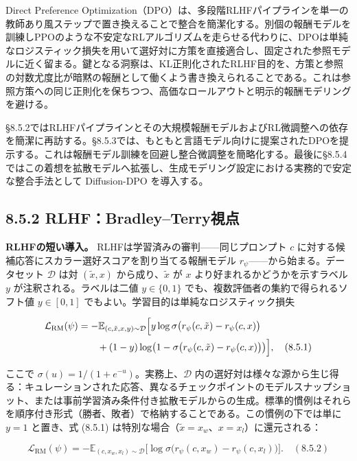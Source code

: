 Direct Preference Optimization（DPO）は、多段階RLHFパイプラインを単一の教師あり風ステップで置き換えることで整合を簡潔化する。別個の報酬モデルを訓練しPPOのような不安定なRLアルゴリズムを走らせる代わりに、DPOは単純なロジスティック損失を用いて選好対に方策を直接適合し、固定された参照モデルに近く留まる。鍵となる洞察は、KL正則化されたRLHF目的を、方策と参照の対数尤度比が暗黙の報酬として働くよう書き換えられることである。これは参照方策への同じ正則化を保ちつつ、高価なロールアウトと明示的報酬モデリングを避ける。


§8.5.2ではRLHFパイプラインとその大規模報酬モデルおよびRL微調整への依存を簡潔に再訪する。§8.5.3では、もともと言語モデル向けに提案されたDPOを提示する。これは報酬モデル訓練を回避し整合微調整を簡略化する。最後に§8.5.4ではこの着想を拡散モデルへ拡張し、生成モデリング設定における実務的で安定な整合手法として Diffusion-DPO を導入する。

\subsection*{8.5.2 RLHF：Bradley–Terry視点}


\textbf{RLHFの短い導入。} RLHFは学習済みの審判——同じプロンプト $c$ に対する候補応答にスカラー選好スコアを割り当てる報酬モデル $r_\psi$——から始まる。データセット $\mathcal{D}$ は対 $(\tilde{x},x)$ から成り、$\tilde{x}$ が $x$ より好まれるかどうかを示すラベル $y$ が注釈される。ラベルは二値 $y\in\{0,1\}$ でも、複数評価者の集約で得られるソフト値 $y\in[0,1]$ でもよい。学習目的は単純なロジスティック損失

\begin{align*}
\begin{aligned}
\mathcal{L}_{\mathrm{RM}}(\psi)
&=-\mathbb{E}_{(c,\tilde{x},x,y)\sim\mathcal{D}}\Bigl[
y\log\sigma\bigl(r_\psi(c,\tilde{x})-r_\psi(c,x)\bigr) \\
&\qquad+(1-y)\log\bigl(1-\sigma\bigl(r_\psi(c,\tilde{x})-r_\psi(c,x)\bigr)\bigr)
\Bigr], \quad (8.5.1)
\end{aligned}
\end{align*}


ここで $\sigma(u)=1/(1+e^{-u})$。実務上、$\mathcal{D}$ 内の選好対は様々な源から生じ得る：キュレーションされた応答、異なるチェックポイントのモデルスナップショット、または事前学習済み条件付き拡散モデルからの生成。標準的慣例はそれらを順序付き形式（勝者、敗者）で格納することである。この慣例の下では単に $y=1$ と置き、式 (8.5.1) は特別な場合（$\tilde{x}=x_w$、$x=x_l$）に還元される：

\[
\mathcal{L}_{\mathrm{RM}}(\psi)=-\mathbb{E}_{(c,x_w,x_l)\sim\mathcal{D}}\bigl[\log\sigma\bigl(r_\psi(c,x_w)-r_\psi(c,x_l)\bigr)\bigr]. \quad (8.5.2)
\]



